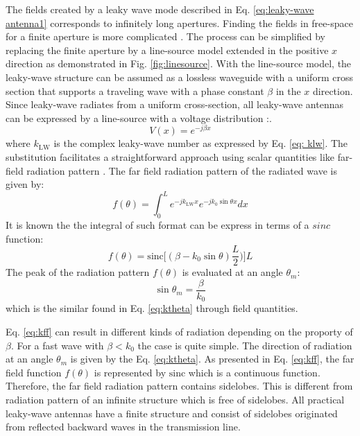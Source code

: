 The fields created by a leaky wave mode described in Eq. \ref{eq:leaky-wave antenna1} corresponds to infinitely long apertures. Finding the fields in free-space for a finite aperture is more complicated \cite{Mahmoud2010}. The process can be simplified by replacing the finite aperture by a line-source model extended in the positive $x$ direction as demonstrated in Fig. \ref{fig:linesource}\cite{Stutzman2012}. With the line-source model, the leaky-wave structure can be assumed as a lossless waveguide with a uniform cross section that supports a traveling wave with a phase constant $\beta$ in the $x$ direction. Since leaky-wave radiates from a uniform cross-section, all leaky-wave antennas can be expressed by a line-source with a voltage distribution \cite{zelinski2005}:. 
\begin{equation}
V(x) = e^{-j \beta x}
\end{equation}
where $k_{\mathrm{LW}}$ is the complex leaky-wave number as expressed by Eq. \ref{eq: klw}.  The substitution facilitates a straightforward approach using scalar quantities like far-field radiation pattern \cite{Sutinjo2008}. The far field radiation pattern of the radiated wave is given by:
%
\begin{equation}
f(\theta) = \int_{0}^{L} e^{-jk_{\mathrm{LW}}x} e^{-jk_0 \sin\theta x} dx 
\end{equation} 
%
It is known the the integral of such format can be express in terms of a $sinc$ function:
%
\begin{equation} \label{eq:kff}
f(\theta) = \mathrm{sinc} \bigg[ (\beta - k_0 \sin\theta) \dfrac{L}{2}) \bigg] L 
\end{equation}
%
The peak of the radiation pattern $f(\theta)$ is evaluated at an angle $\theta_m$:
\begin{equation}
 \sin \theta_m = \dfrac{\beta}{k_0}
\end{equation}
which is the similar found in Eq. \ref{eq:ktheta} through field quantities.

Eq. \ref{eq:kff} can result in different kinds of radiation depending on the proporty of $\beta$. For a fast wave with $\beta < k_0$ the case is quite simple. The direction of radiation at an angle $\theta_m$ is given by the Eq. \ref{eq:ktheta}. As presented in Eq. \ref{eq:kff}, the far field function $f(\theta)$ is represented by $\mathrm{sinc}$ which is a continuous function. Therefore, the far field radiation pattern contains sidelobes. This is different from radiation pattern of an infinite structure which is free of sidelobes. All practical leaky-wave antennas have a finite structure and consist of sidelobes originated from reflected backward waves in the transmission line. %

